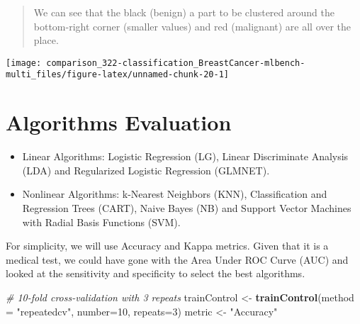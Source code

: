 \documentclass[]{book}
\newenvironment{Shaded}{\begin{snugshade}}{\end{snugshade}}
\newcommand{\CommentTok}[1]{\textcolor[rgb]{0.56,0.35,0.01}{\textit{#1}}}
\newcommand{\ControlFlowTok}[1]{\textcolor[rgb]{0.13,0.29,0.53}{\textbf{#1}}}
\newcommand{\DataTypeTok}[1]{\textcolor[rgb]{0.13,0.29,0.53}{#1}}
\newcommand{\DecValTok}[1]{\textcolor[rgb]{0.00,0.00,0.81}{#1}}
\newcommand{\KeywordTok}[1]{\textcolor[rgb]{0.13,0.29,0.53}{\textbf{#1}}}
\newcommand{\NormalTok}[1]{#1}
\newcommand{\OperatorTok}[1]{\textcolor[rgb]{0.81,0.36,0.00}{\textbf{#1}}}
\newcommand{\StringTok}[1]{\textcolor[rgb]{0.31,0.60,0.02}{#1}}
\begin{document}
\begin{quote}
We can see that the black (benign) a part to be clustered around the bottom-right corner (smaller values) and red (malignant) are all over the place.
\end{quote}

\begin{Shaded}
\end{Shaded}

\begin{center}\texttt{[image: comparison\_322-classification\_BreastCancer-mlbench-multi\_files/figure-latex/unnamed-chunk-20-1]} \end{center}

\hypertarget{algorithms-evaluation}{%
\section{Algorithms Evaluation}\label{algorithms-evaluation}}

\begin{itemize}
\item
  Linear Algorithms: Logistic Regression (LG), Linear Discriminate Analysis (LDA) and Regularized Logistic Regression (GLMNET).
\item
  Nonlinear Algorithms: k-Nearest Neighbors (KNN), Classiﬁcation and Regression Trees (CART), Naive Bayes (NB) and Support Vector Machines with Radial Basis Functions (SVM).
\end{itemize}

For simplicity, we will use Accuracy and Kappa metrics. Given
that it is a medical test, we could have gone with the Area Under ROC Curve (AUC) and looked at the sensitivity and speciﬁcity to select the best algorithms.

\begin{Shaded}
\begin{Highlighting}[]
\CommentTok{# 10-fold cross-validation with 3 repeats}
\NormalTok{trainControl <-}\StringTok{ }\KeywordTok{trainControl}\NormalTok{(}\DataTypeTok{method =} \StringTok{"repeatedcv"}\NormalTok{, }\DataTypeTok{number=}\DecValTok{10}\NormalTok{, }\DataTypeTok{repeats=}\DecValTok{3}\NormalTok{)}
\NormalTok{metric <-}\StringTok{ "Accuracy"}
\end{Highlighting}
\end{Shaded}
\end{document}
